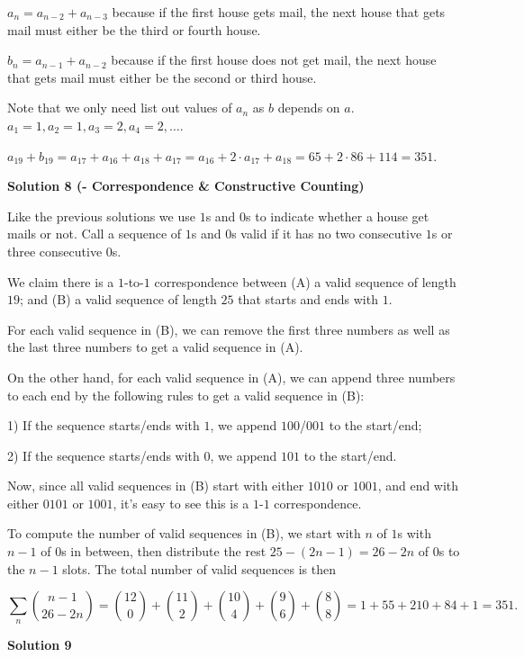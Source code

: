 \begin{enumerate}
 $a_n=a_{n-2}+a_{n-3}$ because if the first house gets mail, the next house that gets mail must either be the third or fourth house.

 $b_n=a_{n-1}+a_{n-2}$ because if the first house does not get mail, the next house that gets mail must either be the second or third house.

 Note that we only need list out values of $a_n$ as $b$ depends on $a$. $a_1=1, a_2=1, a_3=2, a_4=2, \ldots$.

 $a_{19}+b_{19}=a_{17}+a_{16}+a_{18}+a_{17}=a_{16}+2\cdot a_{17}+a_{18}=65+2\cdot 86+114=\boxed{351}$.

 



\textbf{Solution 8 (- Correspondence & Constructive Counting)}

Like the previous solutions we use $1$s and $0$s to indicate whether a house get mails or not. Call a sequence of $1$s and $0$s valid if it has no two consecutive $1$s or three consecutive $0$s.

 We claim there is a $1$-to-$1$ correspondence between (A) a valid sequence of length $19$; and (B) a valid sequence of length $25$ that starts and ends with $1$.

 For each valid sequence in (B), we can remove the first three numbers as well as the last three numbers to get a valid sequence in (A). 

 On the other hand, for each valid sequence in (A), we can append three numbers to each end by the following rules to get a valid sequence in (B):

 1) If the sequence starts/ends with $1$, we append $100$/$001$ to the start/end;

 2) If the sequence starts/ends with $0$, we append $101$ to the start/end.

 Now, since all valid sequences in (B) start with either $1010$ or $1001$, and end with either $0101$ or $1001$, it's easy to see this is a $1$-$1$ correspondence.

 To compute the number of valid sequences in (B), we start with $n$ of $1$s with $n-1$ of $0$s in between, then distribute the rest $25-(2n-1)=26-2n$ of $0$s to the $n-1$ slots. The total number of valid sequences is then

 
 \[\sum_n \binom{n-1}{26-2n} = \binom{12}{0} + \binom{11}{2} + \binom{10}{4} + \binom{9}{6} + \binom{8}{8} = 1 + 55 + 210 + 84 + 1 = 351.\]




\textbf{Solution 9}


\end{enumerate}

